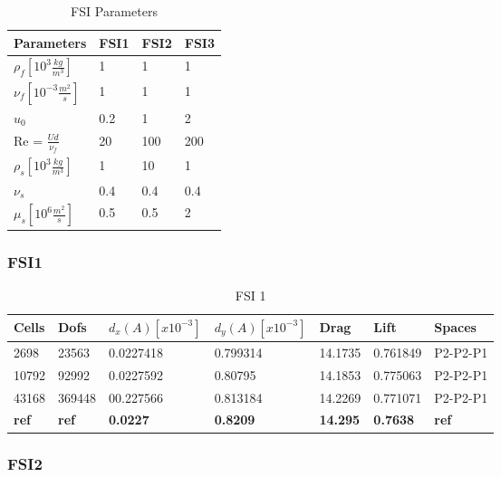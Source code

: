 \begin{table}[h!]
\centering
\caption{FSI Parameters}
\label{my-label}
\begin{tabular}{|l|l|l|l|}
\hline
Parameters & FSI1 & FSI2 & FSI3 \\ \hline
$\rho_f[10^3 \frac{kg}{m^3}]$ & 1 & 1 & 1 \\ \hline
$\nu_f [10^{-3} \frac{m^2}{s}]$ & 1 & 1 & 1 \\ \hline
$u_0$ & 0.2 & 1 & 2 \\ \hline
Re = $\frac{U d}{\nu_f}$ & 20 & 100 & 200 \\ \hline
$\rho_s[10^3 \frac{kg}{m^3}]$ & 1 & 10 & 1 \\ \hline
$\nu_s$ & 0.4 & 0.4 & 0.4 \\ \hline
$\mu_s[10^6 \frac{m^2}{s}]$ & 0.5 & 0.5 & 2 \\ \hline
\end{tabular}
\end{table}

\subsubsection*{FSI1}
\begin{table}[H]
\centering
\caption{FSI 1}
\label{my-label}
\begin{tabular}{|l|l|l|l|l|l|l|}
\hline
Cells & Dofs & $d_x(A) [x10^{-3}]$ & $d_y(A)[x10^{-3}]$ & Drag & Lift & Spaces \\ \hline
2698 & 23563 &0.0227418 &0.799314  &  14.1735 &0.761849 & P2-P2-P1 \\ \hline
10792 & 92992  &0.0227592 & 0.80795 & 14.1853 &  0.775063 &  P2-P2-P1 \\ \hline
43168 & 369448 & 00.227566 & 0.813184 & 14.2269 & 0.771071 & P2-P2-P1 \\ \hline
\textbf{ref} & \textbf{ref} & \textbf{0.0227} & \textbf{0.8209} & \textbf{14.295} & \textbf{0.7638} & \textbf{ref} \\ \hline
\end{tabular}
\end{table}

\subsubsection*{FSI2}


